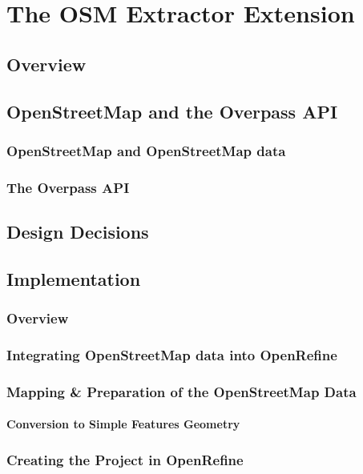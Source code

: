 \chapter{The OSM Extractor Extension}\label{ch:the-osm-extractor-extension2}
\section{Overview}
\lipsum[3-6]

\section{OpenStreetMap and the Overpass API}
\subsection{OpenStreetMap and OpenStreetMap data}
\lipsum[7-9]
\subsection{The Overpass API}
\lipsum[9-11]

\section{Design Decisions}
\lipsum[13-17]

\section{Implementation}
\subsection{Overview}
\lipsum[13-16]
\subsection{Integrating OpenStreetMap data into OpenRefine}
\lipsum[16-18]
\subsection{Mapping \& Preparation of the OpenStreetMap Data}
\lipsum[19-21]
\subsubsection{Conversion to Simple Features Geometry}
\lipsum[21-23]
\subsection{Creating the Project in OpenRefine}
